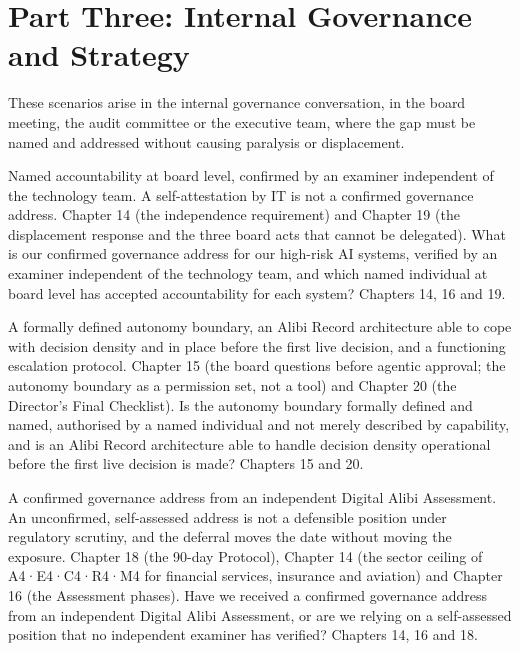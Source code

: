\section{Part Three: Internal Governance and Strategy}

These scenarios arise in the internal governance conversation, in the board meeting, the audit committee or the executive team, where the gap must be named and addressed without causing paralysis or displacement.

{Named accountability at board level, confirmed by an examiner independent of the technology team. A self-attestation by IT is not a confirmed governance address.}
{Chapter 14 (the independence requirement) and Chapter 19 (the displacement response and the three board acts that cannot be delegated).}
{What is our confirmed governance address for our high-risk AI systems, verified by an examiner independent of the technology team, and which named individual at board level has accepted accountability for each system?}
{Chapters 14, 16 and 19.}

{A formally defined autonomy boundary, an Alibi Record architecture able to cope with decision density and in place before the first live decision, and a functioning escalation protocol.}
{Chapter 15 (the board questions before agentic approval; the autonomy boundary as a permission set, not a tool) and Chapter 20 (the Director's Final Checklist).}
{Is the autonomy boundary formally defined and named, authorised by a named individual and not merely described by capability, and is an Alibi Record architecture able to handle decision density operational before the first live decision is made?}
{Chapters 15 and 20.}

{A confirmed governance address from an independent Digital Alibi Assessment. An unconfirmed, self-assessed address is not a defensible position under regulatory scrutiny, and the deferral moves the date without moving the exposure.}
{Chapter 18 (the 90-day Protocol), Chapter 14 (the sector ceiling of A4·E4·C4·R4·M4 for financial services, insurance and aviation) and Chapter 16 (the Assessment phases).}
{Have we received a confirmed governance address from an independent Digital Alibi Assessment, or are we relying on a self-assessed position that no independent examiner has verified?}
{Chapters 14, 16 and 18.}

